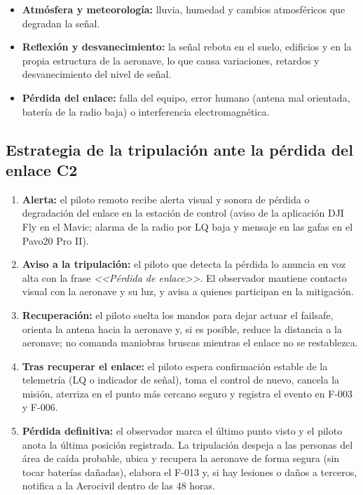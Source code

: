 \begin{itemize}
\item \textbf{Atmósfera y meteorología:} lluvia, humedad y cambios atmosféricos que degradan la señal.
\item \textbf{Reflexión y desvanecimiento:} la señal rebota en el suelo, edificios y en la propia estructura de la aeronave, lo que causa variaciones, retardos y desvanecimiento del nivel de señal.
\item \textbf{Pérdida del enlace:} falla del equipo, error humano (antena mal orientada, batería de la radio baja) o interferencia electromagnética.
\end{itemize}

\subsection{Estrategia de la tripulación ante la pérdida del enlace C2}

\begin{enumerate}
\item \textbf{Alerta:} el piloto remoto recibe alerta visual y sonora de pérdida o degradación del enlace en la estación de control (aviso de la aplicación DJI Fly en el Mavic; alarma de la radio por LQ baja y mensaje en las gafas en el Pavo20 Pro II).
\item \textbf{Aviso a la tripulación:} el piloto que detecta la pérdida lo anuncia en voz alta con la frase \textit{<<Pérdida de enlace>>}. El observador mantiene contacto visual con la aeronave y su luz, y avisa a quienes participan en la mitigación.
\item \textbf{Recuperación:} el piloto suelta los mandos para dejar actuar el failsafe, orienta la antena hacia la aeronave y, si es posible, reduce la distancia a la aeronave; no comanda maniobras bruscas mientras el enlace no se restablezca.
\item \textbf{Tras recuperar el enlace:} el piloto espera confirmación estable de la telemetría (LQ o indicador de señal), toma el control de nuevo, cancela la misión, aterriza en el punto más cercano seguro y registra el evento en F-003 y F-006.
\item \textbf{Pérdida definitiva:} el observador marca el último punto visto y el piloto anota la última posición registrada. La tripulación despeja a las personas del área de caída probable, ubica y recupera la aeronave de forma segura (sin tocar baterías dañadas), elabora el F-013 y, si hay lesiones o daños a terceros, notifica a la Aerocivil dentro de las 48 horas.
\end{enumerate}

